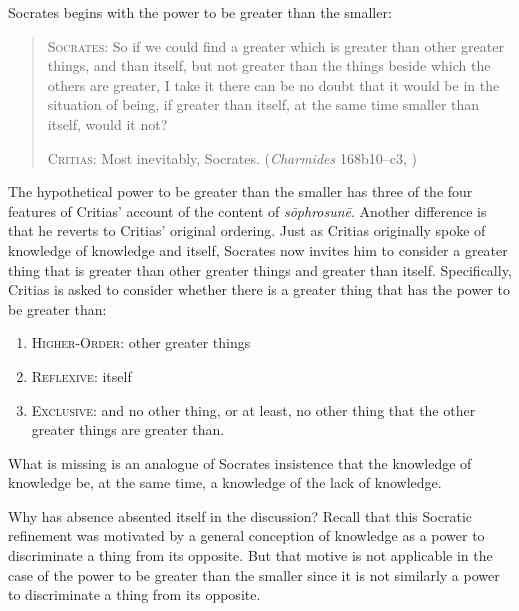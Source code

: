 Socrates begins with the power to be greater than the smaller:
\begin{quotation}
	\textsc{Socrates}: So if we could find a greater which is greater than other greater things, and than itself, but not greater than the things beside which the others are greater, I take it there can be no doubt that it would be in the situation of being, if greater than itself, at the same time smaller than itself, would it not?
	
	\textsc{Critias}: Most inevitably, Socrates. (\emph{Charmides} 168b10–c3, \citealt[61]{Lamb:1927qw})
\end{quotation}
The hypothetical power to be greater than the smaller has three of the four features of Critias' account of the content of \emph{sōphrosunē}. Another difference is that he reverts to Critias' original ordering. Just as Critias originally spoke of knowledge of knowledge and itself, Socrates now invites him to consider a greater thing that is greater than other greater things and greater than itself. Specifically, Critias is asked to consider whether there is a greater thing that has the power to be greater than:
\begin{enumerate}[(1)]
	\item \textsc{Higher-Order}: other greater things
	\item \textsc{Reflexive}: itself
	\item \textsc{Exclusive}: and no other thing, or at least, no other thing that the other greater things are greater than.
\end{enumerate}
What is missing is an analogue of Socrates insistence that the knowledge of knowledge be, at the same time, a knowledge of the lack of knowledge. 

Why has absence absented itself in the discussion? Recall that this Socratic refinement was motivated by a general conception of knowledge as a power to discriminate a thing from its opposite. But that motive is not applicable in the case of the power to be greater than the smaller since it is not similarly a power to discriminate a thing from its opposite.

